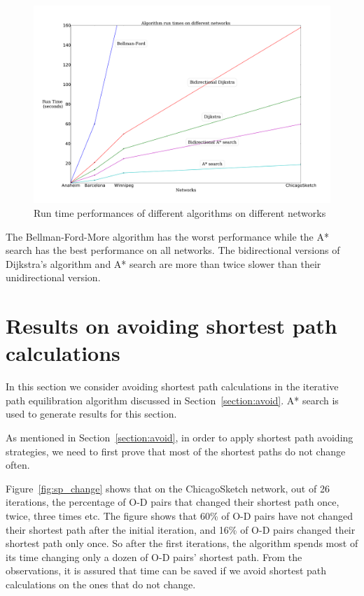\begin{figure}[H]
    \centering
    \includegraphics[width=\textwidth]{img/runtime}
    \caption{Run time performances of different algorithms on different networks}
    \label{fig:allresults}
\end{figure}

The Bellman-Ford-More algorithm has the worst performance while the A* search has the best performance on all networks.
The bidirectional versions of Dijkstra's algorithm and A* search are more than twice slower than their unidirectional version.

\section{Results on avoiding shortest path calculations}
In this section we consider avoiding shortest path calculations in the iterative path equilibration algorithm discussed in Section~\ref{section:avoid}.
A* search is used to generate results for this section.

As mentioned in Section~\ref{section:avoid},
in order to apply shortest path avoiding strategies,
we need to first prove that most of the shortest paths do not change often.

Figure~\ref{fig:sp_change} shows that on the ChicagoSketch network,
out of 26 iterations,
the percentage of O-D pairs that changed their shortest path once, twice, three times etc.
The figure shows that 60\% of O-D pairs have not changed their shortest path after the initial iteration,
and 16\% of O-D pairs changed their shortest path only once.
So after the first iterations,
the algorithm spends most of its time changing only a dozen of O-D pairs' shortest path.
From the observations,
it is assured that time can be saved if we avoid shortest path calculations on the ones that do not change.

